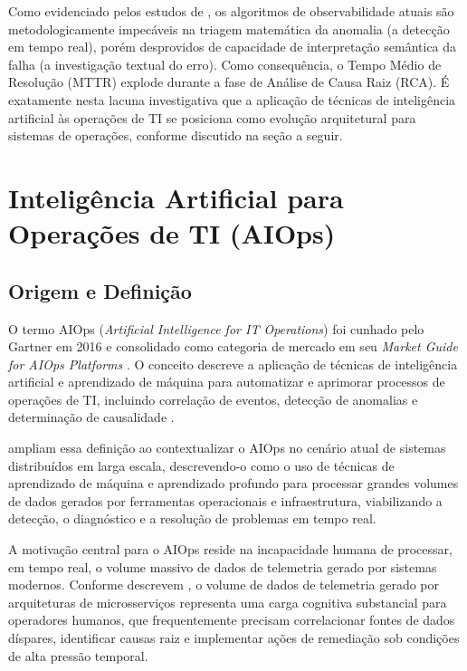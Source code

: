 Como evidenciado pelos estudos de , os algoritmos de observabilidade atuais são metodologicamente impecáveis na triagem matemática da anomalia (a detecção em tempo real), porém desprovidos de capacidade de interpretação semântica da falha (a investigação textual do erro). Como consequência, o Tempo Médio de Resolução (MTTR) explode durante a fase de Análise de Causa Raiz (RCA). É exatamente nesta lacuna investigativa que a aplicação de técnicas de inteligência artificial às operações de TI se posiciona como evolução arquitetural para sistemas de operações, conforme discutido na seção a seguir.

\section{Inteligência Artificial para Operações de TI (AIOps)}
\label{sec:aiops}

\subsection{Origem e Definição}

O termo AIOps (\textit{Artificial Intelligence for IT Operations}) foi cunhado pelo Gartner em 2016 e consolidado como categoria de mercado em seu \textit{Market Guide for AIOps Platforms} \cite{prasad2018market}. O conceito descreve a aplicação de técnicas de inteligência artificial e aprendizado de máquina para automatizar e aprimorar processos de operações de TI, incluindo correlação de eventos, detecção de anomalias e determinação de causalidade \cite{notaro2021survey}.

 ampliam essa definição ao contextualizar o AIOps no cenário atual de sistemas distribuídos em larga escala, descrevendo-o como o uso de técnicas de aprendizado de máquina e aprendizado profundo para processar grandes volumes de dados gerados por ferramentas operacionais e infraestrutura, viabilizando a detecção, o diagnóstico e a resolução de problemas em tempo real.

A motivação central para o AIOps reside na incapacidade humana de processar, em tempo real, o volume massivo de dados de telemetria gerado por sistemas modernos. Conforme descrevem , o volume de dados de telemetria gerado por arquiteturas de microsserviços representa uma carga cognitiva substancial para operadores humanos, que frequentemente precisam correlacionar fontes de dados díspares, identificar causas raiz e implementar ações de remediação sob condições de alta pressão temporal.

